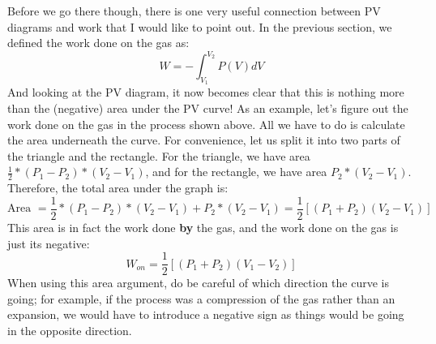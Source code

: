 Before we go there though, there is one very useful connection between PV diagrams and work that I would like to point out. In the previous section, we defined the work done on the gas as:
\[ W = -\int_{V_1}^{V_2} P(V)dV \]
And looking at the PV diagram, it now becomes clear that this is nothing more than the (negative) area under the PV curve! As an example, let's figure out the work done on the gas in the process shown above. All we have to do is calculate the area underneath the curve. For convenience, let us split it into two parts of the triangle and the rectangle. For the triangle, we have area $\frac{1}{2}*\left(P_1-P_2\right)*\left(V_2-V_1\right)$, and for the rectangle, we have area $P_2*\left(V_2-V_1\right)$. Therefore, the total area under the graph is:
\[ \text{Area } = \frac{1}{2}*\left(P_1-P_2\right)*\left(V_2-V_1\right) + P_2*\left(V_2-V_1\right) = \frac{1}{2}\left[\left(P_1+P_2\right)\left(V_2-V_1\right) \right]\]
This area is in fact the work done \textbf{by} the gas, and the work done on the gas is just its negative:
\[W_{on} = \frac{1}{2}\left[\left(P_1+P_2\right)\left(V_1-V_2\right) \right]\]
When using this area argument, do be careful of which direction the curve is going; for example, if the process was a compression of the gas rather than an expansion, we would have to introduce a negative sign as things would be going in the opposite direction. 
